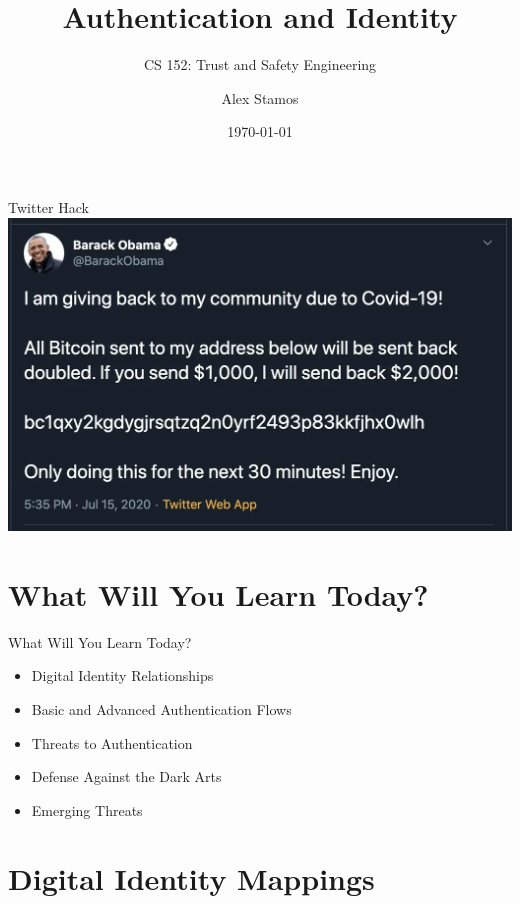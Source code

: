 \documentclass[nobackground,dvipsnames,table]{beamer}
\title{Authentication and Identity}
\subtitle{CS 152: Trust and Safety Engineering}
\author[A. Stamos]{Alex Stamos}
\institute[Stanford University]{Stanford Cyber Policy Center}
\date[2022]{\today}
\begin{document}
\coverpage

\begin{frame}
    \titlepage
\end{frame}

\begin{frame}{Twitter Hack}
    \includegraphics[width=\textwidth]{thanks-obama}
\end{frame}


\section{What Will You Learn Today?}

\begin{frame}{What Will You Learn Today?}
    \Large
    \begin{itemize}
        \item Digital Identity Relationships
        \item Basic and Advanced Authentication Flows
        \item Threats to Authentication
        \item Defense Against the Dark Arts
        \item Emerging Threats
    \end{itemize}
\end{frame}

\section{Digital Identity Mappings}
\end{document}
